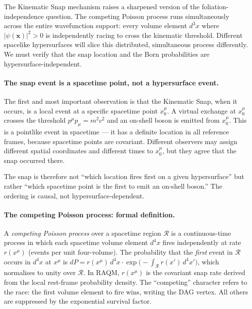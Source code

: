 \documentclass[11pt,a4paper]{article}
\theoremstyle{plain}
\theoremstyle{definition}
\theoremstyle{remark}
\begin{document}
The Kinematic Snap mechanism raises a sharpened version of the
foliation-independence question. The competing Poisson process runs simultaneously
across the entire wavefunction support: every volume element $d^3x$ where
$|\psi(\mathbf{x})|^2 > 0$ is independently racing to cross the kinematic
threshold. Different spacelike hypersurfaces will slice this distributed,
simultaneous process differently. We must verify that the snap location and the
Born probabilities are hypersurface-independent.

\paragraph{The snap event is a spacetime point, not a hypersurface event.}
The first and most important observation is that the Kinematic Snap, when it
occurs, is a local event at a specific spacetime point $x_0^\mu$. A virtual
exchange at $x_0^\mu$ crosses the threshold $p^\mu p_\mu = m^2c^2$ and an
on-shell boson is emitted from $x_0^\mu$. This is a pointlike event in
spacetime --- it has a definite location in all reference frames, because spacetime
points are covariant. Different observers may assign different spatial coordinates
and different times to $x_0^\mu$, but they agree that the snap occurred there.

The snap is therefore not ``which location fires first on a given hypersurface''
but rather ``which spacetime point is the first to emit an on-shell boson.'' The
ordering is causal, not hypersurface-dependent.

\paragraph{The competing Poisson process: formal definition.}
A \emph{competing Poisson process} over a spacetime region $\mathcal{R}$
is a continuous-time process in which each spacetime volume element
$d^4x$ fires independently at rate $r(x^\mu)$ (events per unit four-volume).
The probability that the \emph{first} event in $\mathcal{R}$ occurs
in $d^4x$ at $x^\mu$ is
$dP = r(x^\mu)\,d^4x \cdot \exp\!\bigl(-\int_{\mathcal{R}} r(x')
\,d^4x'\bigr)$,
which normalises to unity over $\mathcal{R}$. In RAQM, $r(x^\mu)$ is the
covariant snap rate derived from the local rest-frame probability density.
The ``competing'' character refers to the race: the first volume element
to fire wins, writing the DAG vertex. All others are suppressed by the
exponential survival factor.
\end{document}

